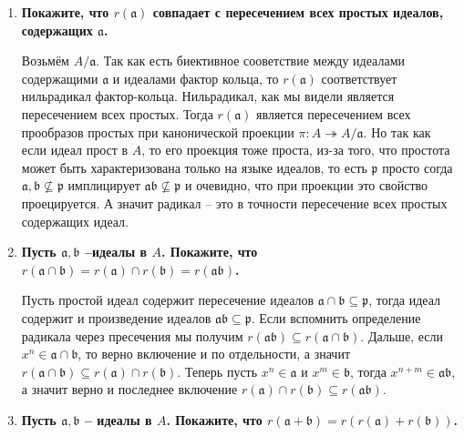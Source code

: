 \documentclass{article}
\begin{document}
\begin{enumerate}
\begin{enumerate}
            \item \textbf{Покажите, что $r(\mathfrak{a})$ совпадает с пересечением всех
                простых идеалов, содержащих $\mathfrak{a}$.}

                Возьмём $A/\mathfrak{a}$. Так как есть биективное сооветствие
                между идеалами содержащими $\mathfrak{a}$ и идеалами фактор
                кольца, то $r(\mathfrak{a})$ соответствует нильрадикал фактор-кольца.
                Нильрадикал, как мы видели является пересечением всех простых.
                Тогда $r(\mathfrak{a})$ является пересечением всех прообразов
                простых при канонической проекции $\pi:A\twoheadrightarrow A/
                \mathfrak{a}$. Но так как если идеал прост в $A$, то его
                проекция тоже проста, из-за того, что простота может быть
                характеризована только на языке идеалов, то есть $\mathfrak{p}$
                просто согда $\mathfrak{a},\mathfrak{b}\nsubseteq\mathfrak{p}$
                имплицирует $\mathfrak{a}\mathfrak{b}\nsubseteq\mathfrak{p}$
                и очевидно, что при проекции это свойство проецируется. А значит
                радикал – это в точности пересечение всех простых содержащих
                идеал.

            \item \textbf{Пусть $\mathfrak{a},\mathfrak{b}$ –идеалы в $A$.
                Покажите, что $r(\mathfrak{a}\cap\mathfrak{b})=r(\mathfrak{a})
                \cap r(\mathfrak{b}) = r(\mathfrak{a}\mathfrak{b})$.}

                Пусть простой идеал содержит пересечение идеалов $\mathfrak{a}\cap
                \mathfrak{b}\subseteq\mathfrak{p}$, тогда идеал содержит и
                произведение идеалов $\mathfrak{a}\mathfrak{b}\subseteq\mathfrak{p}$.
                Если вспомнить определение радикала через пресечения мы получим
                $r(\mathfrak{a}\mathfrak{b})\subseteq r(\mathfrak{a}\cap\mathfrak{b})$.
                Дальше, если $x^n\in\mathfrak{a}\cap\mathfrak{b}$, то верно
                включение и по отдельности, а значит $r(\mathfrak{a}\cap\mathfrak{b})
                \subseteq r(\mathfrak{a})\cap r(\mathfrak{b})$. Теперь пусть
                $x^n\in\mathfrak{a}$ и $x^m\in\mathfrak{b}$, тогда $x^{n+m}\in
                \mathfrak{a}\mathfrak{b}$, а значит верно и последнее включение
                $r(\mathfrak{a})\cap r(\mathfrak{b})\subseteq r(\mathfrak{a}
                \mathfrak{b})$.

            \item \textbf{Пусть $\mathfrak{a},\mathfrak{b}$ – идеалы в $A$.
                Покажите, что $r(\mathfrak{a}+\mathfrak{b})=r(r(\mathfrak{a})+
                r(\mathfrak{b}))$.}


\end{enumerate}
\end{enumerate}
\end{document}
